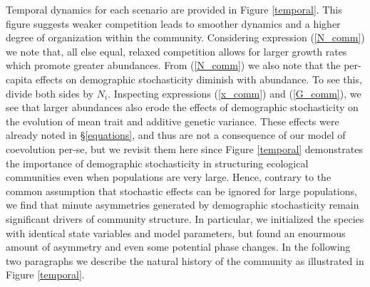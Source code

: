 \documentclass[]{article}
\begin{document}
Temporal dynamics for each scenario are provided in Figure
\ref{temporal}. This figure suggests weaker competition leads to
smoother dynamics and a higher degree of organization within the
community. Considering expression (\ref{N_comm}) we note that, all else
equal, relaxed competition allows for larger growth rates which promote
greater abundances. From (\ref{N_comm}) we also note that the per-capita
effects on demographic stochasticity diminish with abundance. To see
this, divide both sides by \(N_i\). Inspecting expressions
(\ref{x_comm}) and (\ref{G_comm}), we see that larger abundances also
erode the effects of demographic stochasticity on the evolution of mean
trait and additive genetic variance. These effects were already noted in
\S\ref{equations}, and thus are not a consequence of our model of
coevolution per-se, but we revisit them here since Figure \ref{temporal}
demonstrates the importance of demographic stochasticity in structuring
ecological communities even when populations are very large. Hence,
contrary to the common assumption that stochastic effects can be ignored
for large populations, we find that minute asymmetries generated by
demographic stochasticity remain significant drivers of community
structure. In particular, we initialized the species with identical
state variables and model parameters, but found an enourmous amount of
asymmetry and even some potential phase changes. In the following two
paragraphs we describe the natural history of the community as
illustrated in Figure \ref{temporal}.
\end{document}

